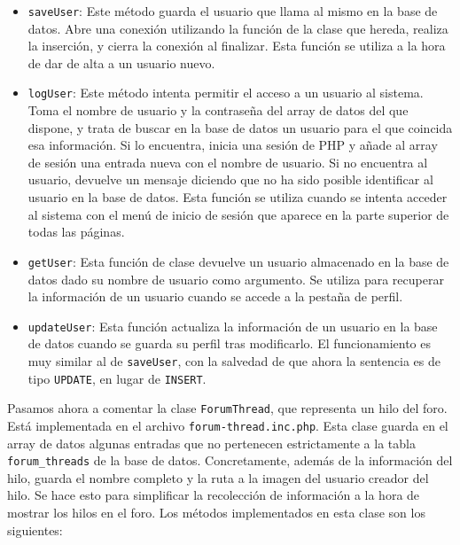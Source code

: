 \documentclass[11pt]{article}
\theoremstyle{plain}
\theoremstyle{definition}
\begin{document}
\begin{itemize}
\item \texttt{saveUser}: Este método guarda el usuario que llama al
  mismo en la base de datos. Abre una conexión utilizando la función
  de la clase que hereda, realiza la inserción, y cierra la conexión
  al finalizar. Esta función se utiliza a la hora de dar de alta a un
  usuario nuevo.
\item \texttt{logUser}: Este método intenta permitir el acceso a un
  usuario al sistema. Toma el nombre de usuario y la contraseña del
  array de datos del que dispone, y trata de buscar en la base de
  datos un usuario para el que coincida esa información. Si lo
  encuentra, inicia una sesión de PHP y añade al array de sesión una
  entrada nueva con el nombre de usuario. Si no encuentra al usuario,
  devuelve un mensaje diciendo que no ha sido posible identificar al
  usuario en la base de datos. Esta función se utiliza cuando se
  intenta acceder al sistema con el menú de inicio de sesión que
  aparece en la parte superior de todas las páginas.
\item \texttt{getUser}: Esta función de clase devuelve un usuario
  almacenado en la base de datos dado su nombre de usuario como
  argumento. Se utiliza para recuperar la información de un usuario
  cuando se accede a la pestaña de perfil.
\item \texttt{updateUser}: Esta función actualiza la información de un
  usuario en la base de datos cuando se guarda su perfil tras
  modificarlo. El funcionamiento es muy similar al de
  \texttt{saveUser}, con la salvedad de que ahora la sentencia es de
  tipo \texttt{UPDATE}, en lugar de \texttt{INSERT}.
\end{itemize}

Pasamos ahora a comentar la clase \texttt{ForumThread}, que representa
un hilo del foro. Está implementada en el archivo
\texttt{forum-thread.inc.php}. Esta clase guarda en el array de datos
algunas entradas que no pertenecen estrictamente a la tabla
\texttt{forum\_threads} de la base de datos. Concretamente, además de
la información del hilo, guarda el nombre completo y la ruta a la
imagen del usuario creador del hilo. Se hace esto para simplificar la
recolección de información a la hora de mostrar los hilos en el
foro. Los métodos implementados en esta clase son los siguientes:
\end{document}
